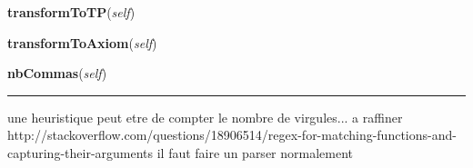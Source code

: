     \vspace{0.5ex}

\hspace{.8\funcindent}\begin{boxedminipage}{\funcwidth}

    \raggedright \textbf{transformToTP}(\textit{self})

\setlength{\parskip}{2ex}
\setlength{\parskip}{1ex}
    \end{boxedminipage}

    \label{etude:utils:futils:Clause:transformToAxiom}

    \vspace{0.5ex}

\hspace{.8\funcindent}\begin{boxedminipage}{\funcwidth}

    \raggedright \textbf{transformToAxiom}(\textit{self})

\setlength{\parskip}{2ex}
\setlength{\parskip}{1ex}
    \end{boxedminipage}

    \label{etude:utils:futils:Clause:nbCommas}

    \vspace{0.5ex}

\hspace{.8\funcindent}\begin{boxedminipage}{\funcwidth}

    \raggedright \textbf{nbCommas}(\textit{self})

    \vspace{-1.5ex}

    \rule{\textwidth}{0.5\fboxrule}
\setlength{\parskip}{2ex}
    une heuristique peut etre de compter le nombre de virgules... a 
    raffiner 
    http://stackoverflow.com/questions/18906514/regex-for-matching-functions-and-capturing-their-arguments
    il faut faire un parser normalement

\setlength{\parskip}{1ex}
    \end{boxedminipage}


